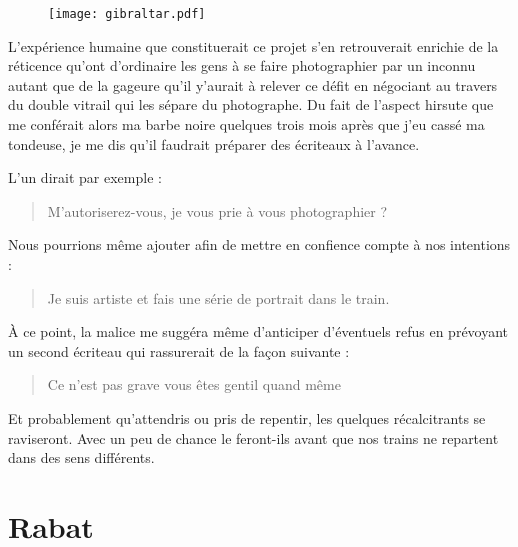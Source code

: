 \begin{prose}
  \begin{figure}[h]
    \centering
    \texttt{[image: gibraltar.pdf]}
    \captionsetup{labelformat=empty}
    \caption[Idéotexte de  (\textarabic{جبل طارق})]{}
  \end{figure}


  L’expérience humaine que constituerait ce projet s’en retrouverait enrichie de la réticence qu’ont d’ordinaire les gens à se faire photographier par un inconnu autant que de la gageure qu’il y’aurait à relever ce défit en négociant au travers du double vitrail qui les sépare du photographe.
  Du fait de l’aspect hirsute que me conférait alors ma barbe noire quelques trois mois après que j’eu cassé ma tondeuse, je me dis qu’il faudrait préparer des écriteaux à l’avance.

  L’un dirait par exemple :

  \begin{quotation}
    M’autoriserez-vous, je vous prie à vous photographier ?
  \end{quotation}

  Nous pourrions même ajouter afin de mettre en confience compte à nos intentions :
  \begin{quotation}
    Je suis artiste et fais une série de portrait dans le train.
  \end{quotation}

  À ce point, la malice me suggéra même d’anticiper d’éventuels refus en prévoyant un second écriteau qui rassurerait de la façon suivante :

  \begin{quotation}
    Ce n’est pas grave vous êtes gentil quand même 
  \end{quotation}

  Et probablement qu’attendris ou pris de repentir, les quelques récalcitrants se raviseront. Avec un peu de chance le feront-ils avant que nos trains ne repartent dans des sens différents.
\end{prose}

\section*{Rabat}

